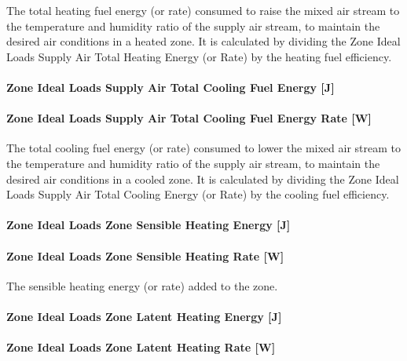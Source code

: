 The total heating fuel energy (or rate) consumed to raise the mixed air stream to the temperature and humidity ratio of the supply air stream, to maintain the desired air conditions in a heated zone. It is calculated by dividing the Zone Ideal Loads Supply Air Total Heating Energy (or Rate) by the heating fuel efficiency.

\paragraph{Zone Ideal Loads Supply Air Total Cooling Fuel Energy {[}J{]}}\label{zone-ideal-loads-supply-air-total-cooling-fuel-energy-j}

\paragraph{Zone Ideal Loads Supply Air Total Cooling Fuel Energy Rate {[}W{]}}\label{zone-ideal-loads-supply-air-total-cooling-fuel-energy-rate-w}

The total cooling fuel energy (or rate) consumed to lower the mixed air stream to the temperature and humidity ratio of the supply air stream, to maintain the desired air conditions in a cooled zone. It is calculated by dividing the Zone Ideal Loads Supply Air Total Cooling Energy (or Rate) by the cooling fuel efficiency.

\paragraph{Zone Ideal Loads Zone Sensible Heating Energy {[}J{]}}\label{zone-ideal-loads-zone-sensible-heating-energy-j}

\paragraph{Zone Ideal Loads Zone Sensible Heating Rate {[}W{]}}\label{zone-ideal-loads-zone-sensible-heating-rate-w}

The sensible heating energy (or rate) added to the zone.

\paragraph{Zone Ideal Loads Zone Latent Heating Energy {[}J{]}}\label{zone-ideal-loads-zone-latent-heating-energy-j}

\paragraph{Zone Ideal Loads Zone Latent Heating Rate {[}W{]}}\label{zone-ideal-loads-zone-latent-heating-rate-w}

